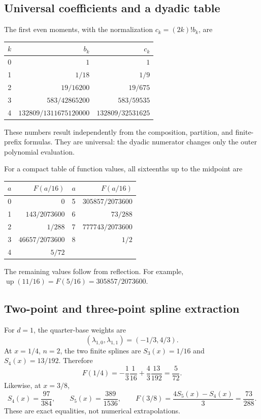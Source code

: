 \documentclass[11pt,a4paper]{article}
\theoremstyle{definition}
\theoremstyle{remark}
\newcommand{\Up}{\operatorname{up}}
\begin{document}
\subsection{Universal coefficients and a dyadic table}
The first even moments, with the normalization \(c_k=(2k)!b_k\), are
\begin{center}
\renewcommand{\arraystretch}{1.35}
\begin{tabular}{c@{\qquad}r@{\qquad}r}
\toprule
\(k\)&\(b_k\)&\(c_k\)\\
\midrule
0&\(1\)&\(1\)\\
1&\(1/18\)&\(1/9\)\\
2&\(19/16200\)&\(19/675\)\\
3&\(583/42865200\)&\(583/59535\)\\
4&\(132809/1311675120000\)&\(132809/32531625\)\\
\bottomrule
\end{tabular}
\end{center}
These numbers result independently from the composition, partition, and finite-prefix
formulas.  They are universal: the dyadic numerator changes only the outer
polynomial evaluation.

For a compact table of function values, all sixteenths up to the midpoint are
\begin{center}
\renewcommand{\arraystretch}{1.22}
\begin{tabular}{c@{\qquad}r@{\qquad\qquad}c@{\qquad}r}
\toprule
\(a\)&\(F(a/16)\)&\(a\)&\(F(a/16)\)\\
\midrule
0&\(0\)&5&\(305857/2073600\)\\
1&\(143/2073600\)&6&\(73/288\)\\
2&\(1/288\)&7&\(777743/2073600\)\\
3&\(46657/2073600\)&8&\(1/2\)\\
4&\(5/72\)&&\\
\bottomrule
\end{tabular}
\end{center}
The remaining values follow from reflection.  For example,
\(\Up(11/16)=F(5/16)=305857/2073600\).

\subsection{Two-point and three-point spline extraction}
For \(d=1\), the quarter-base weights are
\[
 (\lambda_{1,0},\lambda_{1,1})=(-1/3,4/3).
\]
At \(x=1/4\), \(n=2\), the two finite splines are
\(S_3(x)=1/16\) and \(S_4(x)=13/192\).  Therefore
\[
 F(1/4)=-\frac13\frac1{16}+\frac43\frac{13}{192}
       =\frac5{72}.
\]
Likewise, at \(x=3/8\),
\[
 S_4(x)=\frac{97}{384},\qquad S_5(x)=\frac{389}{1536},
 \qquad F(3/8)=\frac{4S_5(x)-S_4(x)}3=\frac{73}{288}.
\]
These are exact equalities, not numerical extrapolations.
\end{document}
